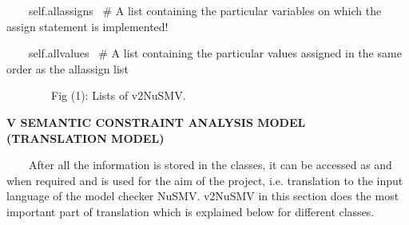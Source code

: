 \documentclass[a4paper]{article}
\begin{document}
\bigskip


\bigskip


\bigskip


\bigskip


\bigskip


\bigskip


\bigskip


\bigskip


\bigskip


\bigskip


\bigskip


\bigskip


\bigskip


\bigskip


\bigskip


\bigskip


\bigskip


\bigskip


\bigskip


\bigskip


\bigskip


\bigskip


\bigskip


\bigskip



\begin{center}
\begin{minipage}{6.51042in}
{\ttfamily\color[rgb]{0.0,0.0,0.039215688}
\ \ \ \ self.allassigns \ \# A list containing the particular variables
on which the {\textquotesingle}assign{\textquotesingle} statement is
implemented!}

{\ttfamily\color[rgb]{0.0,0.0,0.039215688}
\ \ \ \ self.allvalues \ \# A list containing the particular values
assigned in the same order as the allassign list}
\end{minipage}
\end{center}

\bigskip


\bigskip


\bigskip


\bigskip

{\ttfamily\color[rgb]{0.0,0.0,0.039215688}
\ \ \ \ \ \ \ \ \textrm{Fig (1): Lists of v2NuSMV.}}


\bigskip

{\color[rgb]{0.0,0.0,0.039215688}
\textrm{\textbf{V SEMANTIC CONSTRAINT ANALYSIS MODEL (TRANSLATION
MODEL)}}}

{\color[rgb]{0.0,0.0,0.039215688}
\textrm{\ \ }\textrm{\ \ After all the information is stored in the
classes, it can be accessed as and when required and is used for the
aim of the project, i.e. translation to the input language of the model
checker NuSMV. v2NuSMV in this section does the most important part of
translation which is explained below for different classes.}}
\end{document}
